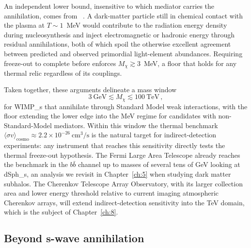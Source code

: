 An independent lower bound, insensitive to which mediator carries the annihilation, comes from \BBN~\cite{Nollett:2014lwa}.
A dark-matter particle still in chemical contact with the plasma at $T \sim 1$~MeV would contribute to the radiation energy density during nucleosynthesis and inject electromagnetic or hadronic energy through residual annihilations, both of which spoil the otherwise excellent agreement between predicted and observed primordial light-element abundances.
Requiring freeze-out to complete before \BBN enforces $M_\chi \gtrsim 3$~MeV, a floor that holds for any thermal relic regardless of its couplings.

Taken together, these arguments delineate a mass window
\begin{equation}
	3~\mathrm{GeV} \lesssim M_\chi \lesssim 100~\mathrm{TeV}\,,
	\label{eq:wimp_window}
\end{equation}
for \glspl{WIMP_} that annihilate through Standard Model weak interactions, with the \BBN floor extending the lower edge into the MeV regime for candidates with non-Standard-Model mediators.
Within this window the thermal benchmark $\langle \sigma v \rangle_\mathrm{cosmo} \approx 2.2 \times 10^{-26}~\mathrm{cm}^3/\mathrm{s}$ is the natural target for indirect-detection experiments: any instrument that reaches this sensitivity directly tests the thermal freeze-out hypothesis.
The Fermi Large Area Telescope already reaches the benchmark in the $b\bar b$ channel up to masses of several tens of GeV looking at \glspl{dSph_}, an analysis we revisit in Chapter~\ref{ch:5} when studying dark matter subhalos. The Cherenkov Telescope Array Observatory, with its larger collection area and lower energy threshold relative to current imaging atmospheric Cherenkov arrays, will extend indirect-detection sensitivity into the TeV domain, which is the subject of Chapter~\ref{ch:8}.

\subsection{Beyond s-wave annihilation}
\label{sec:1.2.4}

